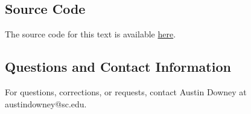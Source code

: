 \documentclass[12pt,letter]{article}
\begin{document}
\vspace{-0.5ex}
\subsection{Source Code}
\vspace{-1ex}
The source code for this text is available 
\href{https://github.com/austindowney/Machine-Learning-for-Engineering-Problem-Solving}{here}.




\subsection{Questions and Contact Information}
\vspace{-1ex}
For questions, corrections, or requests, contact Austin Downey at austindowney@sc.edu.


\clearpage                 	%
\setcounter{secnumdepth}{3} %
\pagebreak

%

\graphicspath{{Chapter_1_Basic_Concepts/}}




















\pagebreak
\renewcommand{\thepage}{}
\renewcommand\refname{References Cited}
\pagestyle{plain}


\end{document}
